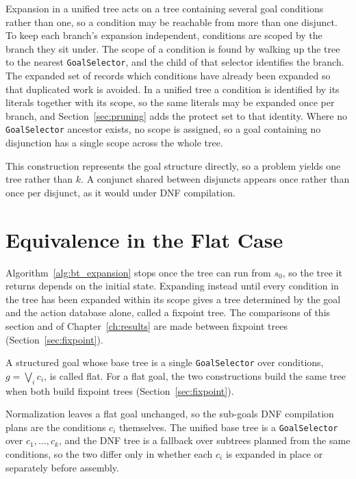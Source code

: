     Expansion in a unified tree acts on a tree containing several goal conditions rather than one, so a condition may be reachable from more than one disjunct.
    To keep each branch's expansion independent, conditions are scoped by the branch they sit under.
    The scope of a condition is found by walking up the tree to the nearest \texttt{GoalSelector}, and the child of that selector identifies the branch.
    The expanded set of \cite{cai2021} records which conditions have already been expanded so that duplicated work is avoided.
    In a unified tree a condition is identified by its literals together with its scope, so the same literals may be expanded once per branch, and Section~\ref{sec:pruning} adds the protect set to that identity.
    Where no \texttt{GoalSelector} ancestor exists, no scope is assigned, so a goal containing no disjunction has a single scope across the whole tree.

    This construction represents the goal structure directly, so a problem yields one tree rather than $k$.
    A conjunct shared between disjuncts appears once rather than once per disjunct, as it would under DNF compilation.

\section{Equivalence in the Flat Case}
\label{sec:equivalence}
    Algorithm~\ref{alg:bt_expansion} stops once the tree can run from $s_0$, so the tree it returns depends on the initial state.
    Expanding instead until every condition in the tree has been expanded within its scope gives a tree determined by the goal and the action database alone, called a fixpoint tree.
    The comparisons of this section and of Chapter~\ref{ch:results} are made between fixpoint trees (Section~\ref{sec:fixpoint}).

    A structured goal whose base tree is a single \texttt{GoalSelector} over conditions, $g = \bigvee_i c_i$, is called flat.
    For a flat goal, the two constructions build the same tree when both build fixpoint trees (Section~\ref{sec:fixpoint}).

    Normalization leaves a flat goal unchanged, so the sub-goals DNF compilation plans are the conditions $c_i$ themselves.
    The unified base tree is a \texttt{GoalSelector} over $c_1, \dots, c_k$, and the DNF tree is a fallback over subtrees planned from the same conditions, so the two differ only in whether each $c_i$ is expanded in place or separately before assembly.

